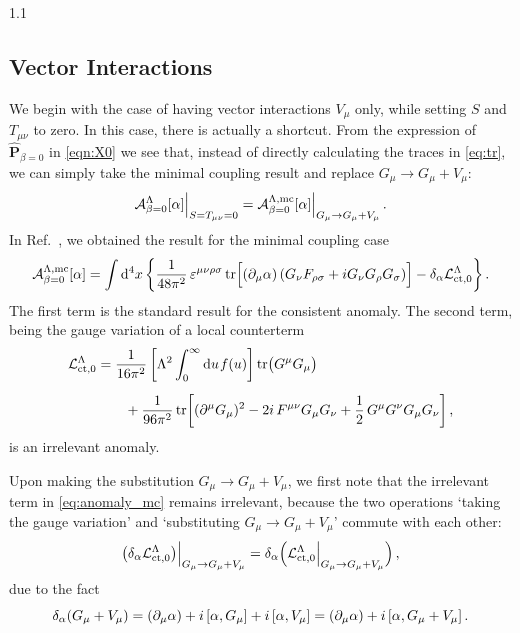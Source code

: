 \documentclass[a4paper,12pt]{article}
\def\L{{\cal L}}
\def\Acal{{\cal A}}
\def\mat#1{\boldsymbol{#1}}
\def\X{\mat{\widehat{P}}}
\def\F{F}
\def\eps{\varepsilon}
\newcommand{\s}{\hspace{0.8pt}}
\begin{document}
\begin{spacing}{1.1}
\subsection{Vector Interactions}
\label{subsec:Vector}

We begin with the case of having vector interactions $V_\mu$ only, while setting $S$ and $T_{\mu\nu}$ to zero. In this case, there is actually a shortcut. From the expression of $\X_{\beta=0}$ in \cref{eqn:X0} we see that, instead of directly calculating the traces in \cref{eq:tr}, we can simply take the minimal coupling result and replace $G_\mu\to G_\mu+V_\mu$:
\begin{equation}
\Acal_{\beta=0}^\Lambda[\alpha]\Bigr|_{S=T_{\mu\nu}=0} = \Acal_{\beta=0}^{\Lambda,\text{mc}}[\alpha] \Bigr|_{G_\mu\to G_\mu+V_\mu} \,.
\end{equation}
In Ref.~\cite{Paper1}, we obtained the result for the minimal coupling case
\begin{equation}
\Acal_{\beta=0}^{\Lambda,\text{mc}}[\alpha] = \int \dd^4x\,\biggl\{ \frac{1}{48\pi^2}\, \eps^{\mu\nu\rho\sigma} \tr
\Bigl[ \left( \partial_\mu \alpha \right) \left( G_\nu \F_{\rho\sigma} + i G_\nu G_\rho G_\sigma \right) \Bigr]
- \delta_\alpha \L_{\text{ct},0}^\Lambda \biggr\} \,.
\label{eq:anomaly_mc}
\end{equation}
The first term is the standard result for the consistent anomaly. The second term, being the gauge variation of a local counterterm
\begin{align}
\L_{\text{ct},0}^\Lambda &= \frac{1}{16\pi^2} \left[ \Lambda^2 \int_0^\infty \dd u\s f(u)\right] \tr\bigl(G^\mu G_\mu\bigr)
\notag\\[5pt]
&\hspace{20pt}
+\frac{1}{96\pi^2} \tr\biggl[ (\partial^\mu G_\mu)^2-2i\,\F^{\mu\nu} G_\mu G_\nu +\frac{1}{2} \,G^\mu G^\nu G_\mu G_\nu \biggr] \,,
\label{eq:Lct0}
\end{align}
is an irrelevant anomaly.

Upon making the substitution $G_\mu\to G_\mu+V_\mu$, we first note that the irrelevant term in \cref{eq:anomaly_mc} remains irrelevant, because the two operations `taking the gauge variation' and `substituting $G_\mu\to G_\mu+V_\mu$' commute with each other:
\begin{equation}
\left( \delta_\alpha \L_{\text{ct},0}^\Lambda \right) \Bigr|_{G_\mu\to G_\mu+V_\mu}
= \delta_\alpha \Bigl( \L_{\text{ct},0}^\Lambda \Bigr|_{G_\mu\to G_\mu+V_\mu} \Bigr) \,,
\end{equation}
due to the fact
\begin{equation}
\delta_\alpha (G_\mu + V_\mu) = (\partial_\mu\alpha) + i\,\comm{\alpha}{G_\mu} +i\, \comm{\alpha}{V_\mu}  = (\partial_\mu\alpha) +i \,\comm{\alpha}{G_\mu + V_\mu} \,.
\end{equation}


\end{spacing}
\end{document}

